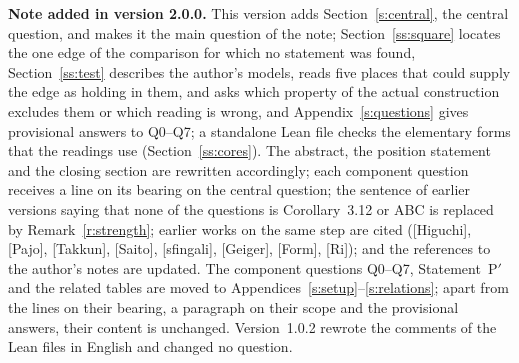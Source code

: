 \documentclass[11pt]{article}
\theoremstyle{definition}
\begin{document}
\begin{abstract}
The small questions Q0--Q7 of earlier versions, on local shears,
their globalization and object membership, are kept in appendices
as component questions about one route, through the difference of
the theta and algebraic sections of [EtTh].  This version answers
them provisionally: the difference of sections does not move degree
readouts, a degree-moving freedom is one positive scalar common to
all places, and the route does not carry the profile switch.  The
abstract implication cores used by the component questions are
checked in Lean, as before, and a standalone Lean file checks the
elementary forms that the readings use; the readings themselves are
not formalized.

No claim is made that Corollary~3.12, the ABC conjecture or the
profile switch is false, or that the construction does not supply
the step.

\medskip
\noindent\textbf{Keywords:} inter-universal Teichm\"uller theory,
Corollary~3.12, Step~(xi), simultaneous holomorphic expressibility,
value-group profile, local shear, mono-theta environment,
anabelian geometry, Lean.
\end{abstract}

\medskip
\noindent\textbf{Note added in version 2.0.0.}
This version adds Section~\ref{s:central}, the central question, and
makes it the main question of the note; Section~\ref{ss:square}
locates the one edge of the comparison for which no statement was
found, Section~\ref{ss:test} describes the author's models, reads
five places that could supply the edge as holding in them, and asks
which property of the actual construction excludes them or which
reading is wrong, and Appendix~\ref{s:questions} gives provisional answers to
Q0--Q7; a standalone Lean file checks the elementary forms that the
readings use (Section~\ref{ss:cores}).  The abstract, the position
statement and the closing section are rewritten accordingly; each
component question receives a line on its bearing on the central
question; the sentence of earlier versions saying that none of the
questions is Corollary~3.12 or ABC is replaced by
Remark~\ref{r:strength}; earlier works on the same step are cited
([Higuchi], [Pajo], [Takkun], [Saito], [sfingali], [Geiger], [Form],
[Ri]); and the references to the author's notes are updated.  The
component questions Q0--Q7, Statement~P$'$ and the related tables
are moved to Appendices~\ref{s:setup}--\ref{s:relations}; apart from
the lines on their bearing, a paragraph on their scope and the
provisional answers, their content is unchanged.  Version~1.0.2 rewrote the comments of the Lean files in
English and changed no question.
\end{document}
